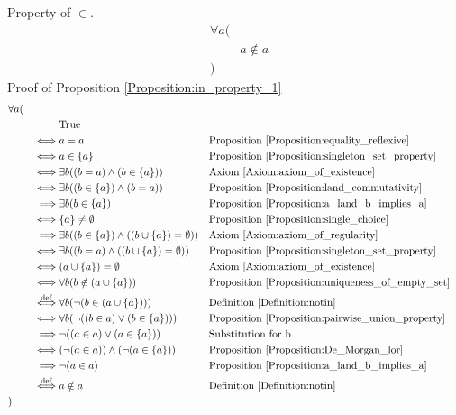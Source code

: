 \begin{prop}
\label{Proposition:in_property_1}
Property of $\in$.
\begin{align*}
& \forall a ( \\
& & a \notin a \\
& )
\end{align*}
Proof of Proposition \ref{Proposition:in_property_1}
\begin{align*}
& \forall a ( \\
& & & \text{True} \\
& & \iff & a = a
& & \text{Proposition \ref{Proposition:equality_reflexive}} \\
& & \iff & a \in \{ a \}
& & \text{Proposition \ref{Proposition:singleton_set_property}} \\
& & \iff & \exists b ((b = a) \land (b \in \{ a \}))
& & \text{Axiom \ref{Axiom:axiom_of_existence}} \\
& & \iff & \exists b ((b \in \{ a \}) \land (b = a))
& & \text{Proposition \ref{Proposition:land_commutativity}} \\
& & \implies & \exists b (b \in \{ a \})
& & \text{Proposition \ref{Proposition:a_land_b_implies_a}} \\
& & \iff & \{ a \} \neq \emptyset
& & \text{Proposition \ref{Proposition:single_choice}} \\
& & \implies & \exists b ((b \in \{ a \}) \land ((b \cup \{ a \}) = \emptyset))
& & \text{Axiom \ref{Axiom:axiom_of_regularity}} \\
& & \iff & \exists b ((b = a) \land ((b \cup \{ a \}) = \emptyset))
& & \text{Proposition \ref{Proposition:singleton_set_property}} \\
& & \iff & (a \cup \{ a \}) = \emptyset
& & \text{Axiom \ref{Axiom:axiom_of_existence}} \\
& & \iff & \forall b (b \notin (a \cup \{ a \}))
& & \text{Proposition \ref{Proposition:uniqueness_of_empty_set}} \\
& & \overset{\operatorname{def}}{\iff} & \forall b (\lnot (b \in (a \cup \{ a \})))
& & \text{Definition \ref{Definition:notin}} \\
& & \iff & \forall b (\lnot ((b \in a) \lor (b \in \{ a \})))
& & \text{Proposition \ref{Proposition:pairwise_union_property}} \\
& & \implies & \lnot ((a \in a) \lor (a \in \{ a \}))
& & \text{Substitution for b} \\
& & \iff & (\lnot (a \in a)) \land (\lnot (a \in \{ a \}))
& & \text{Proposition \ref{Proposition:De_Morgan_lor}} \\
& & \implies & \lnot (a \in a)
& & \text{Proposition \ref{Proposition:a_land_b_implies_a}} \\
& & \overset{\operatorname{def}}{\iff} & a \notin a
& & \text{Definition \ref{Definition:notin}} \\
& )
\end{align*}
\end{prop}

